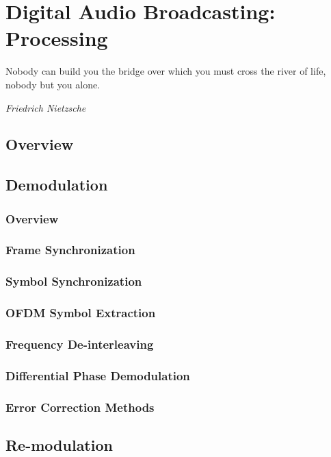 \documentclass[class=report,11pt,crop=false]{standalone}
\begin{document}
\chapter{Digital Audio Broadcasting: Processing}
\epigraph{Nobody can build you the bridge over which you must cross the river of life, nobody but you alone.}%
    {\emph{Friedrich Nietzsche}}

\section{Overview}

\blindmathpaper

\section{Demodulation}
\blindmathpaper

\subsection{Overview}
\subsection{Frame Synchronization}
\blindmathpaper
\subsection{Symbol Synchronization}
\blindmathpaper
\subsection{OFDM Symbol Extraction}
\blindmathpaper
\subsection{Frequency De-interleaving}
\blindmathpaper
\subsection{Differential Phase Demodulation}
\blindmathpaper
\subsection{Error Correction Methods}
\blindmathpaper


\section{Re-modulation}
\end{document}
